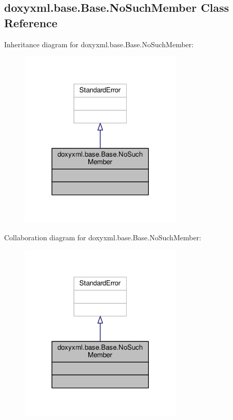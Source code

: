 \subsection{doxyxml.\+base.\+Base.\+No\+Such\+Member Class Reference}
\label{classdoxyxml_1_1base_1_1Base_1_1NoSuchMember}


Inheritance diagram for doxyxml.\+base.\+Base.\+No\+Such\+Member\+:
\nopagebreak
\begin{figure}[H]
\begin{center}
\leavevmode
\includegraphics[width=221pt]{dc/df7/classdoxyxml_1_1base_1_1Base_1_1NoSuchMember__inherit__graph}
\end{center}
\end{figure}


Collaboration diagram for doxyxml.\+base.\+Base.\+No\+Such\+Member\+:
\nopagebreak
\begin{figure}[H]
\begin{center}
\leavevmode
\includegraphics[width=221pt]{d0/d55/classdoxyxml_1_1base_1_1Base_1_1NoSuchMember__coll__graph}
\end{center}
\end{figure}


